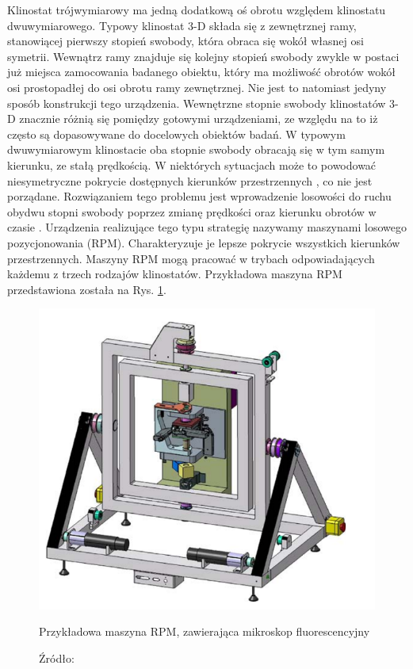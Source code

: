 Klinostat trójwymiarowy ma jedną dodatkową oś obrotu względem klinostatu dwuwymiarowego.
 Typowy klinostat 3-D składa się z zewnętrznej ramy, stanowiącej pierwszy stopień
  swobody, która obraca się wokół własnej osi symetrii. Wewnątrz ramy znajduje się
   kolejny stopień swobody zwykle w postaci już miejsca zamocowania badanego obiektu,
    który ma możliwość obrotów wokół osi prostopadłej do osi obrotu ramy zewnętrznej.
     Nie jest to natomiast jedyny sposób konstrukcji tego urządzenia. Wewnętrzne stopnie
      swobody klinostatów 3-D znacznie różnią się pomiędzy gotowymi urządzeniami, ze
       względu na to iż często są dopasowywane do docelowych obiektów badań. W typowym
        dwuwymiarowym klinostacie oba stopnie swobody obracają się w tym samym kierunku,
         ze stałą prędkością. W niektórych sytuacjach może to powodować niesymetryczne
          pokrycie dostępnych kierunków przestrzennych \cite{bib:rpmy}, co nie jest
           porządane. Rozwiązaniem tego problemu jest wprowadzenie losowości do ruchu
            obydwu stopni swobody poprzez zmianę prędkości oraz kierunku obrotów w
             czasie \cite{bib:rpmy}. Urządzenia realizujące tego typu strategię nazywamy
              maszynami losowego pozycjonowania (RPM). Charakteryzuje je lepsze pokrycie
               wszystkich kierunków przestrzennych. Maszyny RPM mogą pracować w trybach
                odpowiadających każdemu z trzech rodzajów klinostatów. Przykładowa
                 maszyna RPM przedstawiona została na Rys. \ref{fig_rpm}.

\begin{figure}
	\centering
	\includegraphics[scale=0.5]{rpm}
	\caption{Przykładowa maszyna RPM, zawierająca mikroskop fluorescencyjny} 
	\caption*{Źródło: \cite{bib:rpmy}}
	\label{fig_rpm}
\end{figure}

